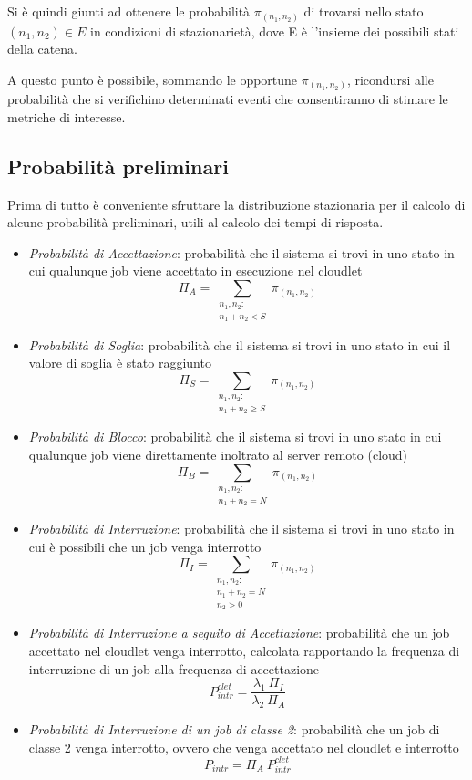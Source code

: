 Si è quindi giunti ad ottenere le probabilità $\pi_{(n_1,n_2)}$ di trovarsi
nello stato $(n_1, n_2) \in E$ in condizioni di stazionarietà, dove E è
l'insieme dei possibili stati della catena.

A questo punto è possibile, sommando le opportune $\pi_{(n_1,n_2)}$, ricondursi
alle probabilità che si verifichino determinati eventi che consentiranno di
stimare le metriche di interesse.
\subsection{Probabilità preliminari}
Prima di tutto è conveniente sfruttare la distribuzione stazionaria per il
calcolo di alcune probabilità preliminari, utili al calcolo dei tempi di
risposta.
\begin{itemize}
\item \emph{Probabilità di Accettazione}: probabilità che il sistema si trovi in
uno stato in cui qualunque job viene accettato in esecuzione nel cloudlet
\begin{equation}
\Pi_A = \sum_{\substack{n_1,n_2:\\n_1 + n_2 < S}} \pi_{(n_1,n_2)}
\end{equation}
\item \emph{Probabilità di Soglia}: probabilità che il sistema si trovi in uno
stato in cui il valore di soglia è stato raggiunto
\begin{equation}
\Pi_S = \sum_{\substack{n_1,n_2:\\ n_1 + n_2 \geq S}} \pi_{(n_1,n_2)}
\end{equation}
\item \emph{Probabilità di Blocco}: probabilità che il sistema si trovi in uno
stato in cui qualunque job viene direttamente inoltrato al server remoto (cloud)
\begin{equation}
\Pi_B = \sum_{\substack{n_1,n_2:\\n_1 + n_2 = N}} \pi_{(n_1,n_2)}
\end{equation}
\item \emph{Probabilità di Interruzione}: probabilità che il sistema si trovi in
uno stato in cui è possibili che un job venga interrotto
\begin{equation}
\Pi_I = \sum_{\substack{n_1,n_2:\\n_1 + n_2 = N\\n_2 > 0}} \pi_{(n_1,n_2)}
\end{equation}
\item \emph{Probabilità di Interruzione a seguito di Accettazione}: probabilità
che un job accettato nel cloudlet venga interrotto, calcolata rapportando la
frequenza di interruzione di un job alla frequenza di accettazione
\begin{equation}
P_{intr}^{clet} = \frac{\lambda_1 \ \Pi_I}{\lambda_2 \ \Pi_A}
\end{equation}
\item \emph{Probabilità di Interruzione di un job di classe 2}: probabilità
che un job di classe 2 venga interrotto, ovvero che venga accettato nel cloudlet
e interrotto
\begin{equation}
P_{intr} = \Pi_A \ P_{intr}^{clet}
\end{equation}
\end{itemize}
